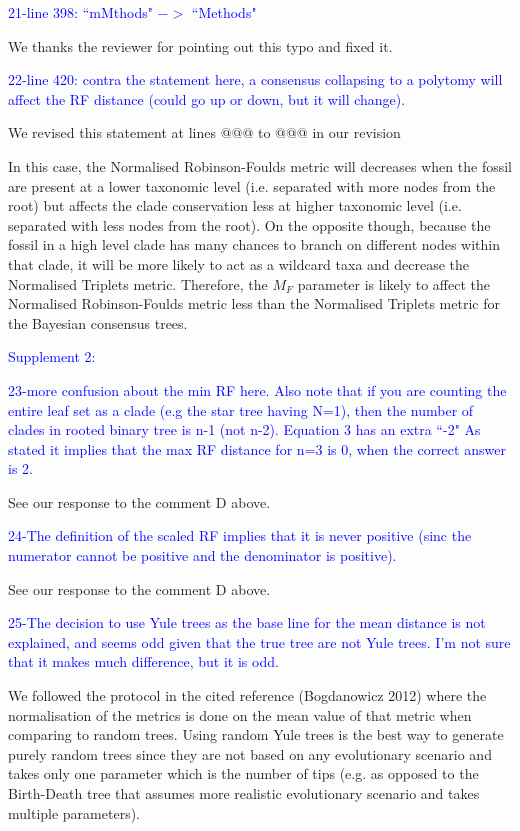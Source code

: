 \documentclass[11pt]{letter}
\begin{document}
\begin{letter}{}

\textcolor{blue}{21-line 398: ``mMthods" $->$ ``Methods"}

We thanks the reviewer for pointing out this typo and fixed it.

\textcolor{blue}{22-line 420: contra the statement here, a consensus collapsing to a polytomy will affect the RF distance (could go up or down, but it will change).}

We revised this statement at lines @@@ to @@@ in our revision

\hfill\begin{minipage}{\dimexpr\textwidth-1cm}
In this case, the Normalised Robinson-Foulds metric will decreases when the fossil are present at a lower taxonomic level (i.e. separated with more nodes from the root) but affects the clade conservation less at higher taxonomic level (i.e. separated with less nodes from the root). On the opposite though, because the fossil in a high level clade has many chances to branch on different nodes within that clade, it will be more likely to act as a wildcard taxa and decrease the Normalised Triplets metric. Therefore, the $M_{F}$ parameter is likely to affect the Normalised Robinson-Foulds metric less than the Normalised Triplets metric for the Bayesian consensus trees.
\end{minipage}

\textcolor{blue}{Supplement 2:}

\textcolor{blue}{23-more confusion about the min RF here. Also note that if you are counting the entire leaf set as a clade (e.g the star tree having N=1), then the number of clades in rooted binary tree is n-1 (not n-2). Equation 3 has an extra ``-2" As stated it implies that the max RF distance for n=3 is 0, when the correct answer is 2.}

See our response to the comment D above.

\textcolor{blue}{24-The definition of the scaled RF implies that it is never positive (sinc the numerator cannot be positive and the denominator is positive).}

See our response to the comment D above.

\textcolor{blue}{25-The decision to use Yule trees as the base line for the mean distance is not explained, and seems odd given that the true tree are not Yule trees. I'm not sure that it makes much difference, but it is odd.}

We followed the protocol in the cited reference (Bogdanowicz 2012) where the normalisation of the metrics is done on the mean value of that metric when comparing to random trees. Using random Yule trees is the best way to generate purely random trees since they are not based on any evolutionary scenario and takes only one parameter which is the number of tips (e.g. as opposed to the Birth-Death tree that assumes more realistic evolutionary scenario and takes multiple parameters).


\end{letter}
\end{document}
